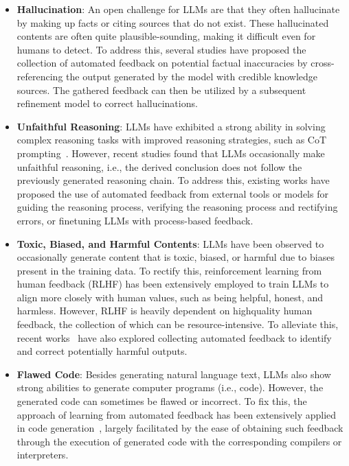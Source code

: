 \documentclass[a4paper,oneside]{book}
\begin{document}
\begin{itemize}
  \item \textbf{Hallucination}: An open challenge for LLMs are that they often hallucinate by making up facts or citing sources that do not exist. These hallucinated contents are often quite plausible-sounding, making it difficult even for humans to detect. To address this, several studies have proposed the collection of automated feedback on potential factual inaccuracies by cross-referencing the output generated by the model with credible knowledge sources. The gathered feedback can then be utilized by a subsequent refinement model to correct hallucinations.

  \item \textbf{Unfaithful Reasoning}: LLMs have exhibited a strong ability in solving complex reasoning tasks with improved reasoning strategies, such as CoT prompting~\cite{wei2023chainofthought}. However, recent studies found that LLMs occasionally make unfaithful reasoning, i.e., the derived conclusion does not follow the previously generated reasoning chain. To address this, existing works have proposed the use of automated feedback from external tools or models for guiding the reasoning process, verifying the reasoning process and rectifying errors, or finetuning LLMs with process-based feedback.

  \item \textbf{Toxic, Biased, and Harmful Contents}: LLMs have been observed to occasionally generate content that is toxic, biased, or harmful due to biases present in the training data. To rectify this, reinforcement learning from human feedback (RLHF) has been extensively employed to train LLMs to align more closely with human values, such as being helpful, honest, and harmless. However, RLHF is heavily dependent on highquality human feedback, the collection of which can be resource-intensive. To alleviate this, recent works~ have also explored collecting automated feedback to identify and correct potentially harmful outputs.

  \item \textbf{Flawed Code}: Besides generating natural language text, LLMs also show strong abilities to generate computer programs (i.e., code). However, the generated code can sometimes be flawed or incorrect. To fix this, the approach of learning from automated feedback has been extensively applied in code generation~\cite{chen2023teaching}, largely facilitated by the ease of obtaining such feedback through the execution of generated code with the corresponding compilers or interpreters.
\end{itemize}
\end{document}
